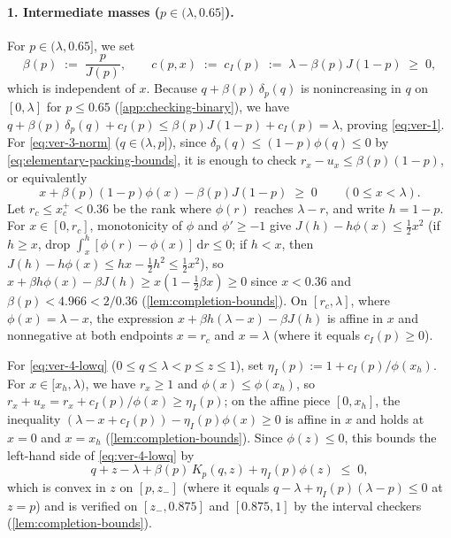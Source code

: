 \documentclass[11pt]{article}
\numberwithin{equation}{section}
\theoremstyle{plain}
\theoremstyle{definition}
\newcommand{\1}{\mathbf{1}}
\begin{document}
\paragraph{1. Intermediate masses ($p \in (\lambda, 0.65]$).}
For $p \in (\lambda, 0.65]$, we set
\begin{equation}
  \beta(p) \;:=\; \frac{p}{J(p)},
  \qquad
  c(p, x) \;:=\; c_I(p) \;:=\; \lambda - \beta(p)J(1 - p) \;\ge\; 0,
  \label{eq:constant-correction}
\end{equation}
which is independent of $x$. Because $q + \beta(p)\,\delta_p(q)$ is nonincreasing in $q$ on $[0, \lambda]$ for $p \le 0.65$ (\cref{app:checking-binary}), we have $q + \beta(p)\,\delta_p(q) + c_I(p) \le \beta(p)J(1 - p) + c_I(p) = \lambda$, proving \cref{eq:ver-1}. For \cref{eq:ver-3-norm} ($q \in (\lambda, p]$), since $\delta_p(q) \le (1 - p)\phi(q) \le 0$ by \cref{eq:elementary-packing-bounds}, it is enough to check $r_x - u_x \le \beta(p)(1 - p)$, or equivalently
\[
  x + \beta(p)(1 - p)\phi(x) - \beta(p)J(1 - p) \;\ge\; 0
  \qquad (0 \le x < \lambda).
\]
Let $r_c \le x_c^+ < 0.36$ be the rank where $\phi(r)$ reaches $\lambda - r$, and write $h = 1 - p$. For $x \in [0, r_c]$, monotonicity of $\phi$ and $\phi' \ge -1$ give $J(h) - h\phi(x) \le \frac{1}{2}x^2$ (if $h \ge x$, drop $\int_x^h [\phi(r) - \phi(x)]\,\mathrm{d}r \le 0$; if $h < x$, then $J(h) - h\phi(x) \le h x - \frac{1}{2}h^2 \le \frac{1}{2}x^2$), so $x + \beta h\phi(x) - \beta J(h) \ge x(1 - \frac{1}{2}\beta x) \ge 0$ since $x < 0.36$ and $\beta(p) < 4.966 < 2/0.36$ (\cref{lem:completion-bounds}). On $[r_c, \lambda]$, where $\phi(x) = \lambda - x$, the expression $x + \beta h(\lambda - x) - \beta J(h)$ is affine in $x$ and nonnegative at both endpoints $x = r_c$ and $x = \lambda$ (where it equals $c_I(p) \ge 0$).

For \cref{eq:ver-4-lowq} ($0 \le q \le \lambda < p \le z \le 1$), set $\eta_I(p) := 1 + c_I(p)/\phi(x_h)$. For $x \in [x_h, \lambda)$, we have $r_x \ge 1$ and $\phi(x) \le \phi(x_h)$, so $r_x + u_x = r_x + c_I(p)/\phi(x) \ge \eta_I(p)$; on the affine piece $[0, x_h]$, the inequality $(\lambda - x + c_I(p)) - \eta_I(p)\phi(x) \ge 0$ is affine in $x$ and holds at $x = 0$ and $x = x_h$ (\cref{lem:completion-bounds}). Since $\phi(z) \le 0$, this bounds the left-hand side of \cref{eq:ver-4-lowq} by
\[
  q + z - \lambda + \beta(p)\,K_p(q, z) + \eta_I(p)\phi(z) \;\le\; 0,
\]
which is convex in $z$ on $[p, z_-]$ (where it equals $q - \lambda + \eta_I(p)(\lambda - p) \le 0$ at $z = p$) and is verified on $[z_-, 0.875]$ and $[0.875, 1]$ by the interval checkers (\cref{lem:completion-bounds}).
\end{document}
